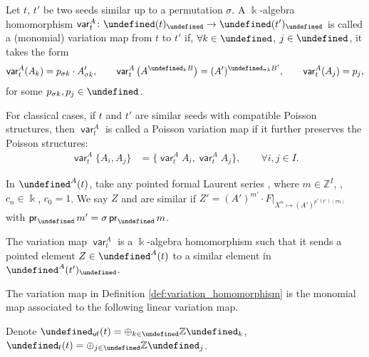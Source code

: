 \documentclass[10pt,a4paper]{amsart}
\newcommand{\kk}{\Bbbk}
\newcommand{\Z}{\mathbb{Z}}
\newcommand{\N}{\mathbb{N}}
\newcommand{\Q}{\mathbb{Q}}
\newcommand{\opname}[1]{\operatorname{\mathsf{#1}}}
\newcommand{\pr}{\opname{pr}}
\newcommand{\var}{\opname{var}}
\newcommand{\fv}{\opname{f}}
\newcommand{\ufv}{\opname{uf}}
\let\Mc\undefined
\let\Iufv\undefined
\let\Ifv\undefined
\let\LP\undefined
\let\fFac\undefined
\let\fFacRoot\undefined
\let\col\undefined
\let\hLP\undefined
\let\ff\undefined
\newcommand{\Mc}{M^\circ}
\newcommand{\Iufv}{I_{\ufv}}
\newcommand{\Ifv}{I_{\fv}}
\newcommand{\LP}{{\mathcal{LP}}}
\newcommand{\fFac}{\mathcal{Z}}
\newcommand{\fFacRoot}{\fFac^{\Q}}
\newcommand{\col}{\opname{col}}
\newcommand{\hLP}{\widehat{\mathcal{LP}}}
\newcommand{\ff}{\mathbf{f}}
\numberwithin{equation}{section}
\begin{document}
\begin{Definition}\label{def:variation_homomorphism} Let $t$, $t'$ be two seeds similar up to a permutation $\sigma$. A $\kk$-algebra homomorphism $\var_{t}^{A}\colon \LP(t)_{\fFacRoot}\rightarrow\LP(t')_{\fFacRoot}$
is called a (monomial) variation map from $t$ to $t'$ if, $\forall k\in\Iufv$,
$j\in\Ifv$, it takes the form
\begin{gather*}
\var_{t}^{A}(A_{k}) = p_{\sigma k}\cdot A_{\sigma k}',\qquad
\var_{t}^{A}\big(A^{\col_{k}B}\big) = (A')^{\col_{\sigma k}B'},\qquad
\var_{t}^{A}(A_{j}) = p_{j},
\end{gather*}
for some $p_{\sigma k},p_{j}\in\fFacRoot$.

For classical cases, if $t$ and $t'$ are similar seeds with compatible Poisson structures, then
$\var_{t}^{A}$ is called a Poisson variation map if it further preserves
the Poisson structures:
\begin{align*}
\var_{t}^{A}\{A_{i},A_{j}\} & =\bigl\{\var_{t}^{A}A_{i},\var_{t}^{A}A_{j}\bigr\},\qquad \forall i,j\in I.
\end{align*}

\end{Definition}

\begin{Definition}
 In $\hLP^A(t)$, take any pointed formal Laurent series , where $m\in \Z^I$, \smash{$F=\sum_{n\in \N_{\ufv}^{\geq 0}} c_n X^n$}, $c_n\in \kk$, $c_0= 1$. We say $Z$ and \smash{$Z'\in \hLP^A(t')_{\fFacRoot}$} are similar if $Z'=(A')^{m'}\cdot F|_{X^{n}\mapsto (A')^{p^*(t')(\sigma n)}}$ with $\pr_{\Iufv}m'=\sigma \pr_{\Iufv}m$.
\end{Definition}

\begin{Remark}\label{rem:variation_map_pointed_elements}
 The variation map $\var_t^A$ is a $\kk$-algebra homomorphism such that it sends a pointed element $Z\in\LP^A(t)$ to a similar element in $\LP^A(t')_{\fFacRoot}$.
\end{Remark}


The variation map in Definition \ref{def:variation_homomorphism}
is the monomial map associated to the following linear variation map.

Denote $\Mc_{\ufv}(t)=\oplus_{k\in\Iufv}\Z\ff_{k}$, $\Mc_{\fv}(t)=\oplus_{j\in\Ifv}\Z\ff_{j}$.
\end{document}
